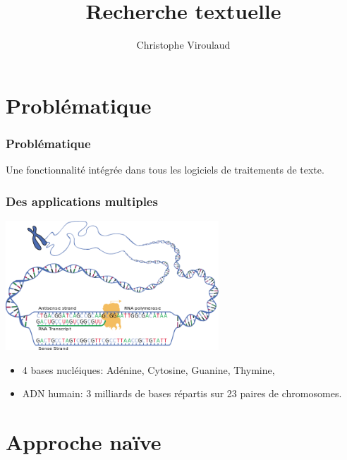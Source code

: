 \documentclass[svgnames,11pt]{beamer}
\author[]{Christophe Viroulaud}
\title{Recherche textuelle}
\date{}
\institute{Terminale - NSI}
\begin{document}
\begin{frame}
\titlepage
\end{frame}

\section{Problématique}
\begin{frame}
    \frametitle{Problématique}

    Une fonctionnalité intégrée dans tous les logiciels de traitements de texte.
\end{frame}
\begin{frame}
    \frametitle{Des applications multiples}
\begin{center}
\centering
\includegraphics[width=8cm]{ressources/adn.png}
\label{adn}
\end{center}
\begin{itemize}
    \item 4 bases nucléiques: Adénine, Cytosine, Guanine, Thymine,
    \item ADN humain: 3 milliards de bases répartis sur 23 paires de chromosomes.
\end{itemize}
\end{frame}
\begin{frame}
    \frametitle{}

    \begin{center}
    \end{center}

\end{frame}
\section{Approche naïve}
\end{document}
